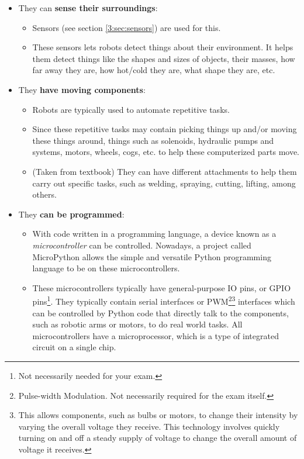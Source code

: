 \documentclass[../main.tex]{subfiles}
\begin{document}
\begin{itemize}
    \item They can \textbf{sense their surroundings}: 
        \begin{itemize}
            \item Sensors (see section \ref{3:sec:sensors}) are used for this.
            \item These sensors lets robots detect things about their environment. It helps them detect things like the shapes and sizes of objects, their masses, how far away they are, how hot/cold they are, what shape they are, etc.
        \end{itemize}
    \item They \textbf{have moving components}:
        \begin{itemize}
            \item Robots are typically used to automate repetitive tasks.
            \item Since these repetitive tasks may contain picking things up and/or moving these things around, things such as solenoids, hydraulic pumps and systems, motors, wheels, cogs, etc. to help these computerized parts move.
            \item (Taken from textbook) They can have  different attachments to help them carry out specific tasks, such as welding, spraying, cutting, lifting, among others.
        \end{itemize}
    \item They \textbf{can be programmed}:
        \begin{itemize}
            \item With code written in a programming language, a device known as a \emph{microcontroller} can be controlled. Nowadays, a project called MicroPython allows the simple and versatile Python programming language to be on these microcontrollers. 
            \item These microcontrollers typically have general-purpose IO pins, or GPIO pins\footnote{Not necessarily needed for your exam.}. They typically contain serial interfaces or PWM\footnote{Pulse-width Modulation. Not necessarily required for the exam itself.}\footnote{This allows components, such as bulbs or motors, to change their intensity by varying the overall voltage they receive. This technology involves quickly turning on and off a steady supply of voltage to change the overall amount of voltage it receives.} interfaces which can be controlled by Python code that directly talk to the components, such as robotic arms or motors, to do real world tasks.
All microcontrollers have a microprocessor, which is a type of integrated circuit on a single chip.
        \end{itemize}
\end{itemize}
\end{document}
